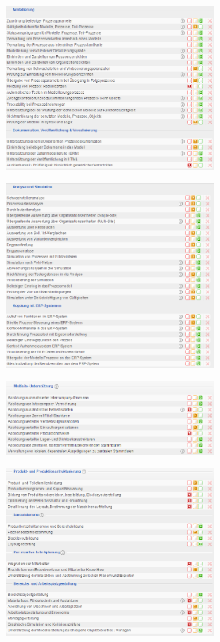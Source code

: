 \documentclass[12pt]{article}
\begin{document}
\begin{figure}[!h]
\centering
\includegraphics[width=0.7\textwidth]{images/tr41}
\end{figure}\FloatBarrier
\noindent
\begin{figure}[!h]
\centering
\includegraphics[width=0.7\textwidth]{images/tr42}
\end{figure}\FloatBarrier
\noindent
\begin{figure}[!h]
\centering
\includegraphics[width=0.7\textwidth]{images/tr43}
\end{figure}\FloatBarrier
\noindent
\begin{figure}[!h]
\centering
\includegraphics[width=0.7\textwidth]{images/tr44}
\end{figure}\FloatBarrier
\end{document}
